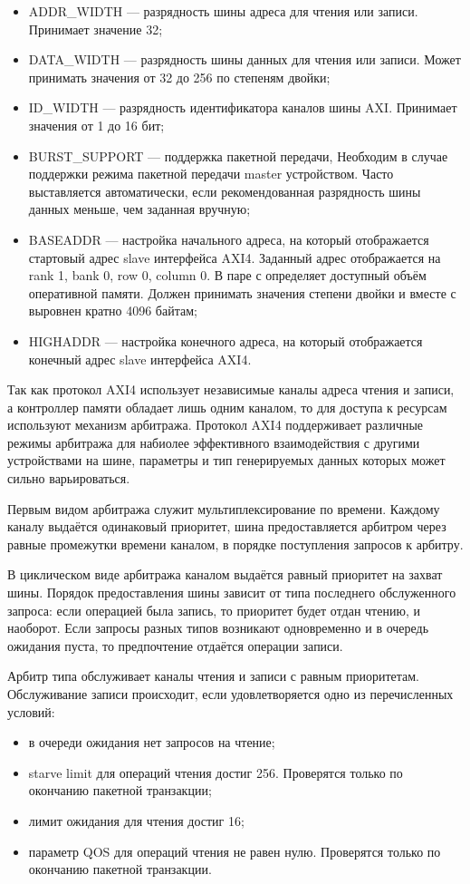 \begin{itemize}
  \item ADDR\_WIDTH --- разрядность шины адреса для чтения или записи. Принимает значение 32;
  \item DATA\_WIDTH --- разрядность шины данных для чтения или записи. Может принимать значения
    от 32 до 256 по степеням двойки;
  \item ID\_WIDTH --- разрядность идентификатора каналов шины AXI. Принимает значения от 1 до 16 бит;
  \item BURST\_SUPPORT --- поддержка пакетной передачи, Необходим в случае поддержки режима пакетной передачи
    master устройством. Часто выставляется автоматически, если рекомендованная разрядность шины данных
    меньше, чем заданная вручную;
  \item BASEADDR --- настройка начального адреса, на который отображается стартовый адрес slave интерфейса
    AXI4. Заданный адрес отображается на rank 1, bank 0, row 0, column 0. В паре с  определяет
    доступный объём оперативной памяти. Должен принимать значения степени двойки и вместе с  выровнен
    кратно 4096 байтам;
  \item HIGHADDR --- настройка конечного адреса, на который отображается конечный адрес slave интерфейса
    AXI4.
\end{itemize}

Так как протокол AXI4 использует независимые каналы адреса чтения и записи, а контроллер памяти
обладает лишь одним каналом, то для доступа к ресурсам используют механизм арбитража.
Протокол AXI4 поддерживает различные режимы арбитража для набиолее эффективного взаимодействия с
другими устройствами на шине, параметры и тип генерируемых данных которых может сильно варьироваться.

Первым видом арбитража служит мультиплексирование по времени. Каждому каналу выдаётся одинаковый приоритет,
шина предоставляется арбитром через равные промежутки времени каналом, в порядке поступления запросов к арбитру.

В циклическом виде арбитража каналом выдаётся равный приоритет на захват шины. Порядок предоставления шины
зависит от типа последнего обслуженного запроса: если операцией была запись, то приоритет будет отдан чтению,
и наоборот. Если запросы разных типов возникают одновременно и в очередь ожидания пуста, то предпочтение
отдаётся операции записи.

Арбитр типа  обслуживает каналы чтения и записи с равным приоритетам.
Обслуживание записи происходит, если удовлетворяется одно из перечисленных условий:
\begin{itemize}
  \item в очереди ожидания нет запросов на чтение;
  \item starve limit для операций чтения достиг 256. Проверятся только по окончанию пакетной транзакции;
  \item лимит ожидания для чтения достиг 16;
  \item параметр QOS для операций чтения не равен нулю. Проверятся только по окончанию пакетной транзакции.
\end{itemize}

